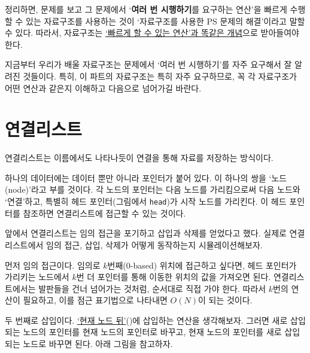 정리하면, 문제를 보고 그 문제에서 `\textbf{여러 번 시행하기}를 요구하는 연산'을 빠르게 수행할 수 있는 자료구조를 사용하는 것이 `자료구조를 사용한 PS 문제의 해결'이라고 말할 수 있다. 따라서, 자료구조는 \underline{`빠르게 할 수 있는 연산'과 똑같은 개념}으로 받아들여야 한다. 

지금부터 우리가 배울 자료구조는 문제에서 `여러 번 시행하기'를 자주 요구해서 잘 알려진 것들이다. 특히, 이 파트의 자료구조는 특히 자주 요구하므로, 꼭 각 자료구조가 어떤 연산과 같은지 이해하고 다음으로 넘어가길 바란다.

\section{연결리스트}
연결리스트는 이름에서도 나타나듯이 연결을 통해 자료를 저장하는 방식이다. 

\begin{figure}[htbp]
    \centering
\end{figure}

하나의 데이터에는 데이터 뿐만 아니라 포인터가 붙어 있다. 이 하나의 쌍을 `노드(node)'라고 부를 것이다. 각 노드의 포인터는 다음 노드를 가리킴으로써 다음 노드와 `연결'하고, 특별히 헤드 포인터(그림에서 \texttt{head})가 시작 노드를 가리킨다. 이 헤드 포인터를 참조하면 연결리스트에 접근할 수 있는 것이다.

앞에서 연결리스트는 임의 접근을 포기하고 삽입과 삭제를 얻었다고 했다. 실제로 연결리스트에서 임의 접근, 삽입, 삭제가 어떻게 동작하는지 시뮬레이션해보자.

먼저 임의 접근이다. 임의로 $k$번째($0$-based) 위치에 접근하고 싶다면, 헤드 포인터가 가리키는 노드에서 $k$번 더 포인터를 통해 이동한 위치의 값을 가져오면 된다. 연결리스트에서는 발판들을 건너 넘어가는 것처럼, 순서대로 직접 가야 한다. 따라서 $k$번의 연산이 필요하고, 이를 점근 표기법으로 나타내면 $O(N)$이 되는 것이다.

두 번째로 삽입이다. \underline{`현재 노드 뒤'}()에 삽입하는 연산을 생각해보자. 그러면 새로 삽입되는 노드의 포인터를 현재 노드의 포인터로 바꾸고, 현재 노드의 포인터를 새로 삽입되는 노드로 바꾸면 된다. 아래 그림을 참고하자.


